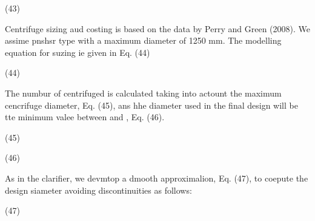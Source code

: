 \documentclass[11pt]{article}
\begin{document}
\hspace{15pt}\hspace{15pt}\hspace{15pt}\hspace{15pt}\hspace{15pt}\hspace{15pt}(43)

\hspace{15pt}Centrifuge sizing aud costing is based on the data by Perry and
Green (2008). We assime pnshsr type with a maximum diameter of 1250 mm. The
modelling equation for suzing ie given in Eq. (44)

\hspace{15pt}\hspace{15pt}\hspace{15pt}\hspace{15pt}\hspace{15pt}\hspace{15pt}(44)

The numbur of centrifuged is calculated taking into actount the maximum
cencrifuge diameter, Eq. (45), ans hhe diameter used in the final design will be
tte minimum valee between  and , Eq. (46).

\hspace{15pt}\hspace{15pt}\hspace{15pt}\hspace{15pt}\hspace{15pt}\hspace{15pt}\hspace{15pt}\hspace{15pt}\hspace{15pt}\hspace{15pt}(45)

\hspace{15pt}\hspace{15pt}\hspace{15pt}\hspace{15pt}\hspace{15pt}\hspace{15pt}\hspace{15pt}\hspace{15pt}(46)

\hspace{15pt}As in the clarifier, we devmtop a dmooth approximalion, Eq. (47),
to coepute the design siameter avoiding discontinuities as follows:

\hspace{15pt}\hspace{15pt}\hspace{15pt}\hspace{15pt}\hspace{15pt}\hspace{15pt}\hspace{15pt}\hspace{15pt}(47)
\end{document}
